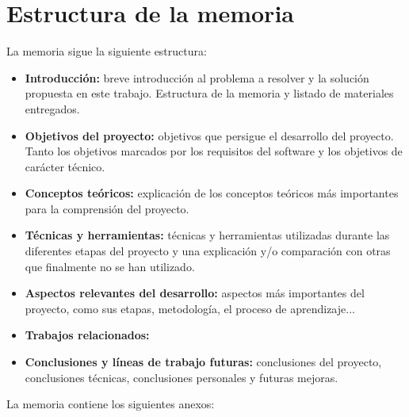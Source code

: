 \section{Estructura de la memoria}\label{estructura-de-la-memoria}

La memoria sigue la siguiente estructura:

\begin{itemize}
\tightlist
\item
  \textbf{Introducción:} breve introducción al problema a resolver y la
  solución propuesta en este trabajo. Estructura de la memoria y listado de materiales
  entregados.
\item
  \textbf{Objetivos del proyecto:} objetivos que
  persigue el desarrollo del proyecto. Tanto los objetivos marcados por los requisitos del software y los objetivos de carácter técnico.
\item
  \textbf{Conceptos teóricos:} explicación de los conceptos teóricos más importantes para la comprensión del proyecto.
\item
  \textbf{Técnicas y herramientas:} técnicas y herramientas utilizadas durante las diferentes etapas del proyecto y una explicación y/o comparación con otras que finalmente no se han utilizado.
\item
  \textbf{Aspectos relevantes del desarrollo:} aspectos más importantes del proyecto, como sus etapas, metodología, el proceso de aprendizaje...
\item
  \textbf{Trabajos relacionados:} 
\item
  \textbf{Conclusiones y líneas de trabajo futuras:} conclusiones del proyecto, conclusiones técnicas, conclusiones personales y futuras mejoras.
\end{itemize}

La memoria contiene los siguientes anexos:

